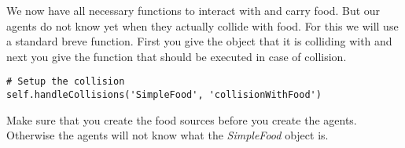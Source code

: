 We now have all necessary functions to interact with and carry food. But our agents do not know yet when they actually collide with food. For this we will use a standard breve function. First you give the object that it is colliding with and next you give the function that should be executed in case of collision.
\begin{fullwidth}
\begin{lstlisting}
# Setup the collision
self.handleCollisions('SimpleFood', 'collisionWithFood')
\end{lstlisting}
\end{fullwidth}

Make sure that you create the food sources before you create the agents. Otherwise the agents will not know what the \textit{SimpleFood} object is.

